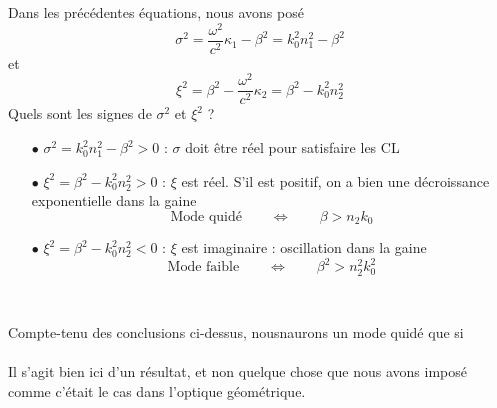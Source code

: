 Dans les précédentes équations, nous avons posé
\begin{equation}
{\sigma ^2} = \frac{{{\omega ^2}}}{{{c^2}}}{\kappa _1} - {\beta ^2} = k_0^2n_1^2 - {\beta ^2}
\end{equation}
et
\begin{equation}
{\xi ^2} = {\beta ^2} - \frac{{{\omega ^2}}}{{{c^2}}}{\kappa _2} = {\beta ^2} - k_0^2n_2^2
\end{equation}
Quels sont les signes de $\sigma^2$ et $\xi^2$ ? 
\begin{itemize}
\item[$\bullet$] ${\sigma ^2} = k_0^2n_1^2 - {\beta ^2} > 0$ : $\sigma$ doit être réel pour 
satisfaire les CL
\item[$\bullet$] ${\xi ^2} = {\beta ^2} - k_0^2n_2^2 > 0$ : $\xi$ est réel. S'il est positif, on a
bien une décroissance exponentielle dans la gaine
\begin{equation}
\text{Mode quidé}\qquad\Leftrightarrow\qquad \beta > n_2k_0
\end{equation}
\item[$\bullet$] ${\xi ^2} = {\beta ^2} - k_0^2n_2^2 < 0$ : $\xi$ est imaginaire : oscillation 
dans la gaine
\begin{equation}
\text{Mode faible}\qquad\Leftrightarrow\qquad \beta^2> n_2^2k_0^2
\end{equation}
\end{itemize}\

Compte-tenu des conclusions ci-dessus, nousnaurons un mode quidé que si\\

\ \\

Il s'agit bien ici d'un résultat, et non quelque chose que nous avons imposé comme c'était le cas
dans l'optique géométrique.














